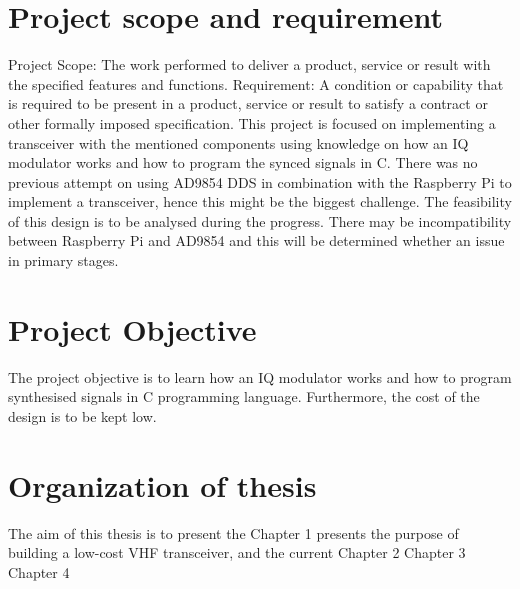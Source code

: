 \section{Project scope and requirement}
Project Scope: The work performed to deliver a product, service or result with the specified features and functions. 
Requirement: A condition or capability that is required to be present in a product, service or result to satisfy a contract or other formally imposed specification.
This project is focused on implementing a transceiver with the mentioned components using knowledge on how an IQ modulator works and how to program the synced signals in C. 
There was no previous attempt on using AD9854 DDS in combination with the Raspberry Pi to implement a transceiver, hence this might be the biggest challenge. The feasibility of this design is to be analysed during the progress. There may be incompatibility between Raspberry Pi and AD9854 and this will be determined whether an issue in primary stages.



\section{Project Objective}
The project objective is to learn how an IQ modulator works and how to program synthesised signals in C programming language.
Furthermore, the cost of the design is to be kept low.



\section{Organization of thesis}

The aim of this thesis is to present the 
Chapter 1 presents the purpose of building a low-cost VHF transceiver, and the current 
Chapter 2
Chapter 3
Chapter 4






